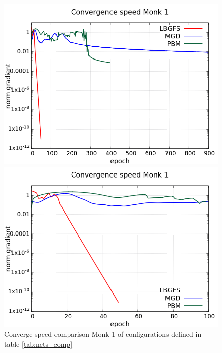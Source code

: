 \begin{figure}[H]
	\centering
	\begin{minipage}[t]{0.5\linewidth}
		\includegraphics[width=\linewidth]{data/Comparison/Monk1/Monk1_CS_Comparison_log_standard.png}
	\end{minipage}%
	\begin{minipage}[t]{0.5\linewidth}
		\includegraphics[width=\linewidth]{data/Comparison/Monk1/Monk1_CS_Comparison_log_zoom.png}
	\end{minipage}
	\caption{Converge speed comparison Monk 1 of configurations defined in table \ref{tab:nets_comp}}
	\label{CS-Monk1}
\end{figure}
